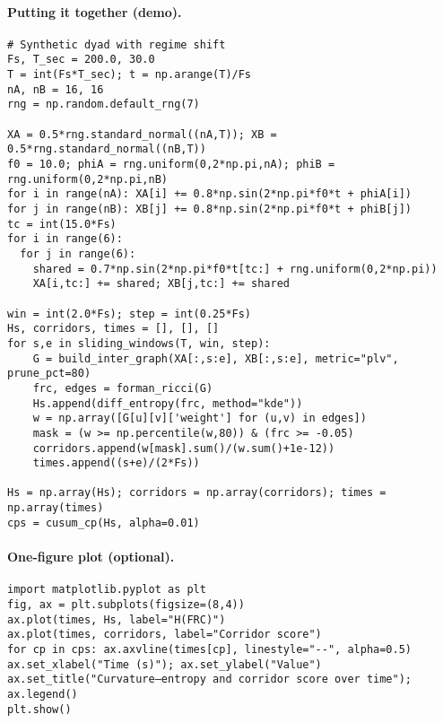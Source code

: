 \documentclass{article}
\theoremstyle{definition}
\begin{document}
\paragraph{Putting it together (demo).}
\begin{verbatim}
# Synthetic dyad with regime shift
Fs, T_sec = 200.0, 30.0
T = int(Fs*T_sec); t = np.arange(T)/Fs
nA, nB = 16, 16
rng = np.random.default_rng(7)

XA = 0.5*rng.standard_normal((nA,T)); XB = 0.5*rng.standard_normal((nB,T))
f0 = 10.0; phiA = rng.uniform(0,2*np.pi,nA); phiB = rng.uniform(0,2*np.pi,nB)
for i in range(nA): XA[i] += 0.8*np.sin(2*np.pi*f0*t + phiA[i])
for j in range(nB): XB[j] += 0.8*np.sin(2*np.pi*f0*t + phiB[j])
tc = int(15.0*Fs)
for i in range(6):
  for j in range(6):
    shared = 0.7*np.sin(2*np.pi*f0*t[tc:] + rng.uniform(0,2*np.pi))
    XA[i,tc:] += shared; XB[j,tc:] += shared

win = int(2.0*Fs); step = int(0.25*Fs)
Hs, corridors, times = [], [], []
for s,e in sliding_windows(T, win, step):
    G = build_inter_graph(XA[:,s:e], XB[:,s:e], metric="plv", prune_pct=80)
    frc, edges = forman_ricci(G)
    Hs.append(diff_entropy(frc, method="kde"))
    w = np.array([G[u][v]['weight'] for (u,v) in edges])
    mask = (w >= np.percentile(w,80)) & (frc >= -0.05)
    corridors.append(w[mask].sum()/(w.sum()+1e-12))
    times.append((s+e)/(2*Fs))

Hs = np.array(Hs); corridors = np.array(corridors); times = np.array(times)
cps = cusum_cp(Hs, alpha=0.01)
\end{verbatim}

\paragraph{One-figure plot (optional).}
\begin{verbatim}
import matplotlib.pyplot as plt
fig, ax = plt.subplots(figsize=(8,4))
ax.plot(times, Hs, label="H(FRC)")
ax.plot(times, corridors, label="Corridor score")
for cp in cps: ax.axvline(times[cp], linestyle="--", alpha=0.5)
ax.set_xlabel("Time (s)"); ax.set_ylabel("Value")
ax.set_title("Curvature–entropy and corridor score over time"); ax.legend()
plt.show()
\end{verbatim}
\end{document}
